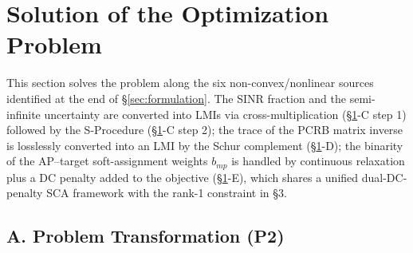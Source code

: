 \documentclass[12pt,a4paper]{article}
\begin{document}
\section{Solution of the Optimization Problem}\label{sec:relaxation}

This section solves the problem along the six non-convex/nonlinear sources identified at the end of \S\ref{sec:formulation}. The SINR fraction and the semi-infinite uncertainty are converted into LMIs via cross-multiplication (\S\ref{sec:relaxation}-C step 1) followed by the S-Procedure (\S\ref{sec:relaxation}-C step 2); the trace of the PCRB matrix inverse is losslessly converted into an LMI by the Schur complement (\S\ref{sec:relaxation}-D); the binarity of the AP--target soft-assignment weights $b_{mp}$ is handled by continuous relaxation plus a DC penalty added to the objective (\S\ref{sec:relaxation}-E), which shares a unified dual-DC-penalty SCA framework with the rank-1 constraint in \S3.

\subsection*{A. Problem Transformation (P2)}
\end{document}

